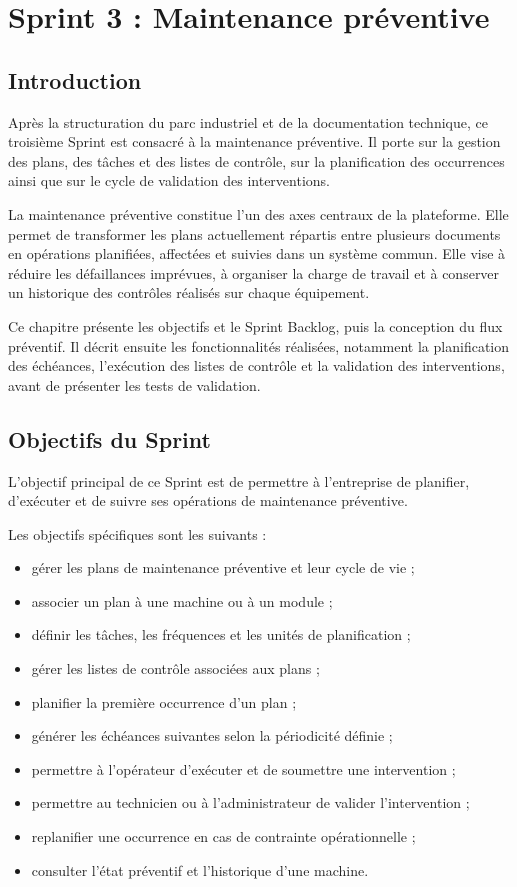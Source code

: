 \section{Sprint 3 : Maintenance préventive}

\subsection{Introduction}

Après la structuration du parc industriel et de la documentation technique, ce troisième Sprint est consacré à la maintenance préventive. Il porte sur la gestion des plans, des tâches et des listes de contrôle, sur la planification des occurrences ainsi que sur le cycle de validation des interventions.

La maintenance préventive constitue l'un des axes centraux de la plateforme. Elle permet de transformer les plans actuellement répartis entre plusieurs documents en opérations planifiées, affectées et suivies dans un système commun. Elle vise à réduire les défaillances imprévues, à organiser la charge de travail et à conserver un historique des contrôles réalisés sur chaque équipement.

Ce chapitre présente les objectifs et le Sprint Backlog, puis la conception du flux préventif. Il décrit ensuite les fonctionnalités réalisées, notamment la planification des échéances, l'exécution des listes de contrôle et la validation des interventions, avant de présenter les tests de validation.

\subsection{Objectifs du Sprint}

L'objectif principal de ce Sprint est de permettre à l'entreprise de planifier, d'exécuter et de suivre ses opérations de maintenance préventive.

Les objectifs spécifiques sont les suivants :

\begin{itemize}
    \item gérer les plans de maintenance préventive et leur cycle de vie ;
    \item associer un plan à une machine ou à un module ;
    \item définir les tâches, les fréquences et les unités de planification ;
    \item gérer les listes de contrôle associées aux plans ;
    \item planifier la première occurrence d'un plan ;
    \item générer les échéances suivantes selon la périodicité définie ;
    \item permettre à l'opérateur d'exécuter et de soumettre une intervention ;
    \item permettre au technicien ou à l'administrateur de valider l'intervention ;
    \item replanifier une occurrence en cas de contrainte opérationnelle ;
    \item consulter l'état préventif et l'historique d'une machine.
\end{itemize}

